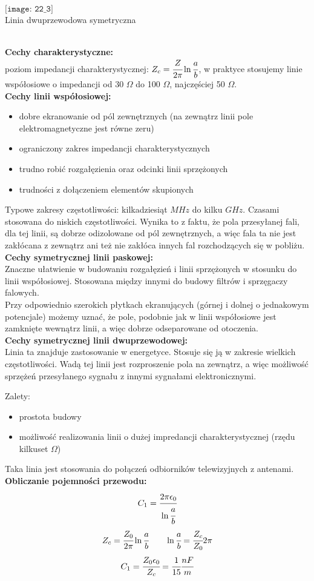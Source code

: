 \begin{solution}
	$\texttt{[image: 22\_3]}$ \\
	\caption{Linia dwuprzewodowa symetryczna}\\
\textbf{Cechy charakterystyczne:}\\
poziom impedancji charakterystycznej: $Z_{c}=\cfrac{Z}{2\pi}\ln{\cfrac{a}{b}}$, w praktyce stosujemy linie współosiowe o impedancji od 30 $\Omega$ do 100 $\Omega$, najczęściej 50 $\Omega$.\\ 
\textbf{Cechy linii współosiowej:}
\begin{itemize}
\item dobre ekranowanie od pól zewnętrznych (na zewnątrz linii pole elektromagnetyczne jest równe zeru)
\item ograniczony zakres impedancji charakterystycznych
\item trudno robić rozgałęzienia oraz odcinki linii sprzężonych
\item trudności z dołączeniem elementów skupionych
\end{itemize}
Typowe zakresy częstotliwości: kilkadziesiąt $MHz$ do kilku $GHz$. Czasami stosowana do niskich częstotliwości. Wynika to z faktu, że pola przesyłanej fali, dla tej linii, są dobrze odizolowane od pól zewnętrznych, a więc fala ta nie jest zakłócana z zewnątrz ani też nie zakłóca innych fal rozchodzących się w pobliżu.\\
\textbf{Cechy symetrycznej linii paskowej:}\\
Znaczne ułatwienie w budowaniu rozgałęzień i linii sprzężonych w stosunku do linii współosiowej. Stosowana między innymi do budowy filtrów i sprzęgaczy falowych.\\
Przy odpowiednio szerokich płytkach ekranujących (górnej i dolnej o jednakowym potencjale) możemy uznać, że pole, podobnie jak w linii współosiowe jest zamknięte wewnątrz linii, a więc dobrze odseparowane od otoczenia.\\
\textbf{Cechy symetrycznej linii dwuprzewodowej:}\\
Linia ta znajduje zastosowanie w energetyce. Stosuje się ją w zakresie wielkich częstotliwości. Wadą tej linii jest rozproszenie pola na zewnątrz, a więc możliwość sprzężeń przesyłanego sygnału z innymi sygnałami elektronicznymi.

Zalety:
\begin{itemize}
\item prostota budowy
\item możliwość realizowania linii o dużej impredancji charakterystycznej (rzędu kilkuset $\Omega$)
\end{itemize}
Taka linia jest stosowania do połączeń odbiorników telewizyjnych z antenami.\\

\textbf{Obliczanie pojemności przewodu:}\\
$$C_{1}=\cfrac{2\pi\epsilon_{0}}{\ln{\cfrac{a}{b}}}$$
$$Z_{c}=\cfrac{Z_{0}}{2\pi}\ln{\cfrac{a}{b}} \ \ \ \ \ \ \ln{\cfrac{a}{b}}=\cfrac{Z_{c}}{Z_{0}}2\pi$$
$$C_{1}=\cfrac{Z_{0}\epsilon_{0}}{Z_{c}}=\cfrac{1}{15} \cfrac{nF}{m}$$


\end{solution}
